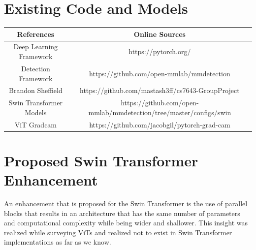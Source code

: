 \documentclass[10pt,twocolumn,letterpaper]{article}
\begin{document}
{\small


}

\clearpage
\appendix
\label{sec:appendix}

\section{Existing Code and Models} \label{existingCodeSection}


\begin{table}[h!]
\begin{center}
\begin{tabular}{||c|c||}
\hline
References & Online Sources \\
\hline\hline
Deep Learning Framework & https://pytorch.org/ \\
Detection Framework     & https://github.com/open-mmlab/mmdetection \\
Brandon Sheffield       & https://github.com/mastash3ff/cs7643-GroupProject \\
Swin Transformer Models & https://github.com/open-mmlab/mmdetection/tree/master/configs/swin \\
ViT Gradcam & https://github.com/jacobgil/pytorch-grad-cam \\
\hline
\end{tabular}
\end{center}
\label{tab:existing}
\end{table}

\clearpage

\section{Proposed Swin Transformer Enhancement} \label{proposedSwin}



An enhancement that is proposed for the Swin Transformer is the use of parallel blocks that results in an architecture that has the same number of parameters and computational complexity while being wider and shallower. This insight was realized while surveying ViTs\cite{touvron2022three} and realized not to exist in Swin Transformer implementations as far as we know.
\end{document}
